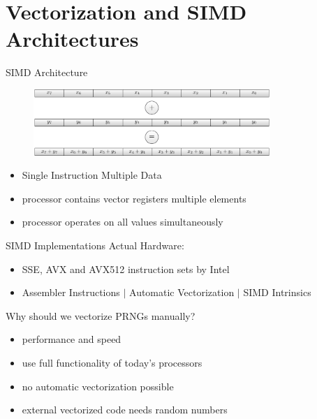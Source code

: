 \documentclass[aspectratio=169]{beamer}
\begin{document}
  \section{Vectorization and SIMD Architectures} %
    \begin{frame}{SIMD Architecture}
      \begin{figure}
        \includegraphics[width=0.8\textwidth]{figures/simd_vector_operations.pdf}
      \end{figure}
      \begin{itemize}
        \pause
        \item Single Instruction Multiple Data
        \pause
        \item processor contains vector registers multiple elements
        \pause
        \item processor operates on all values simultaneously
      \end{itemize}
    \end{frame}

    \begin{frame}{SIMD Implementations}
      Actual Hardware:
      \begin{itemize}
        \pause
        \item SSE, AVX and AVX512 instruction sets by Intel
        \pause
        \item Assembler Instructions $|$ Automatic Vectorization $|$ SIMD Intrinsics
      \end{itemize}
      \bigskip
      \pause
      Why should we vectorize PRNGs manually?
      \begin{itemize}
        \pause
        \item performance and speed
        \pause
        \item use full functionality of today's processors
        \pause
        \item no automatic vectorization possible
        \pause
        \item external vectorized code needs random numbers
      \end{itemize}
    \end{frame}
\end{document}
